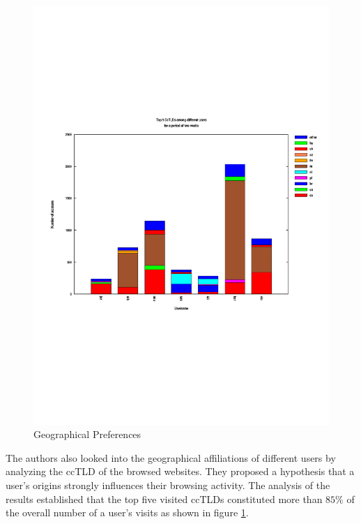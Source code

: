 \begin{figure}[h!]
\begin{center}
  \includegraphics* [width=0.60\linewidth]{figures/cybermetrics-geography}	
  \caption{Geographical Preferences \cite{nmelnikov:thesis:2010}}
  \label{fig:cybermetrics-geography}
\end{center}
\end{figure}
The authors also looked into the geographical affiliations of different users by analyzing the \ac{ccTLD} of the browsed websites. They proposed a hypothesis that a user's origins strongly  influences their browsing activity. The analysis of the results established that the top five visited \ac{ccTLD}s constituted more than $85\%$ of the overall number of a user's visits as shown in figure \ref{fig:cybermetrics-geography}.
 

